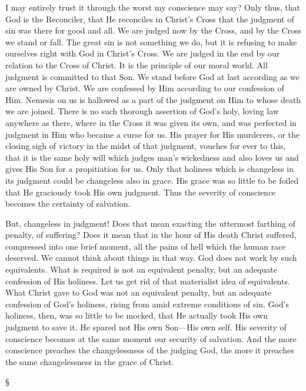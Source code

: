 \documentclass[12pt,a5paper,twoside,titlepage]{book}
\begin{document}
I may entirely trust it through the worst my 
conscience may say? Only thus, that God is the 
Reconciler, that He reconciles in Christ's Cross 
that the judgment of sin was there for good and 
all. We are judged now by the Cross, and by 
the Cross we stand or fall. The great sin is not 
something we do, but it is refusing to make ourselves 
right with God in Christ's Cross. We are 
judged in the end by our relation to the Cross of 
Christ. It is the principle of our moral world. 
All judgment is committed to that Son. We 
stand before God at last according as we are 
owned by Christ. We are confessed by Him 
according to our confession of Him. Nemesis 
on us is hallowed as a part of the judgment 
on Him to whose death we are joined. There is 
no such thorough assertion of God's holy, loving 
law anywhere as there, where in the Cross it 
was given its own, and was perfected in judgment 
in Him who became a curse for us. His 
prayer for His murderers, or the closing sigh of 
victory in the midst of that judgment, vouches 
for ever to this, that it is the same holy will 
which judges man's wickedness and also loves us 
and gives His Son for a propitiation for us. 
Only that holiness which is changeless in its 
judgment could be changeless also in grace. 
His grace was so little to be foiled that He 
graciously took His own judgment. Thus the 
severity of conscience becomes the certainty of 
salvation. 


But, changeless in judgment! Does that mean 
exacting the uttermost farthing of penalty, of 
suffering? Does it mean that in the hour of 
His death Christ suffered, compressed into one 
brief moment, all the pains of hell which the 
human race deserved. We cannot think about 
things in that way. God does not work by such 
equivalents. What is required is not an equivalent 
penalty, but an adequate confession of His 
holiness. Let us get rid of that materialist 
idea of equivalents. What Christ gave to God 
was not an equivalent penalty, but an adequate 
confession of God's holiness, rising from amid 
extreme conditions of sin. God's holiness, then, 
was so little to be mocked, that He actually 
took His own judgment to save it. He spared 
not His own Son---His own self. His severity 
of conscience becomes at the same moment our 
security of salvation. And the more conscience 
preaches the changelessness of the judging God, 
the more it preaches the same changelessness in 
the grace of Christ. 

\begin{center}
\S
\end{center}
\end{document}
